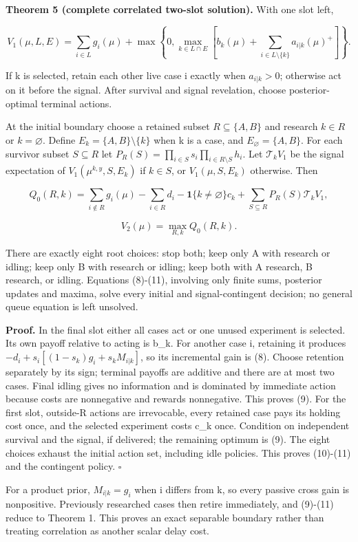 \documentclass[
  11pt,
]{article}
\begin{document}
\textbf{Theorem 5 (complete correlated two-slot solution).} With one
slot left,

\[V_1(\mu,L,E)=\sum_{i\in L}g_i(\mu)+
\max\left\{0,\max_{k\in L\cap E}
\left[b_k(\mu)+\sum_{i\in L\setminus\{k\}}a_{i|k}(\mu)^+\right]\right\}. \tag{9}\]

If k is selected, retain each other live case i exactly when
\(a_{i|k}>0\); otherwise act on it before the signal. After survival and
signal revelation, choose posterior-optimal terminal actions.

At the initial boundary choose a retained subset \(R\subseteq\{A,B\}\)
and research \(k\in R\) or \(k=\varnothing\). Define
\(E_k=\{A,B\}\setminus\{k\}\) when k is a case, and
\(E_\varnothing=\{A,B\}\). For each survivor subset \(S\subseteq R\) let
\(P_R(S)=\prod_{i\in S}s_i\prod_{i\in R\setminus S}h_i\). Let
\(\mathcal T_k V_1\) be the signal expectation of
\(V_1(\mu^{k,y},S,E_k)\) if \(k\in S\), or \(V_1(\mu,S,E_k)\) otherwise.
Then

\[Q_0(R,k)=\sum_{i\notin R}g_i(\mu)-\sum_{i\in R}d_i
-\mathbf1\{k\ne\varnothing\}c_k
+\sum_{S\subseteq R}P_R(S)\mathcal T_kV_1, \tag{10}\]

\[V_2(\mu)=\max_{R,k}Q_0(R,k). \tag{11}\]

There are exactly eight root choices: stop both; keep only A with
research or idling; keep only B with research or idling; keep both with
A research, B research, or idling. Equations (8)-(11), involving only
finite sums, posterior updates and maxima, solve every initial and
signal-contingent decision; no general queue equation is left unsolved.

\textbf{Proof.} In the final slot either all cases act or one unused
experiment is selected. Its own payoff relative to acting is b\_k. For
another case i, retaining it produces
\(-d_i+s_i[(1-s_k)g_i+s_kM_{i|k}]\), so its incremental gain is (8).
Choose retention separately by its sign; terminal payoffs are additive
and there are at most two cases. Final idling gives no information and
is dominated by immediate action because costs are nonnegative and
rewards nonnegative. This proves (9). For the first slot, outside-R
actions are irrevocable, every retained case pays its holding cost once,
and the selected experiment costs c\_k once. Condition on independent
survival and the signal, if delivered; the remaining optimum is (9). The
eight choices exhaust the initial action set, including idle policies.
This proves (10)-(11) and the contingent policy. \(\square\)

For a product prior, \(M_{i|k}=g_i\) when i differs from k, so every
passive cross gain is nonpositive. Previously researched cases then
retire immediately, and (9)-(11) reduce to Theorem 1. This proves an
exact separable boundary rather than treating correlation as another
scalar delay cost.
\end{document}
